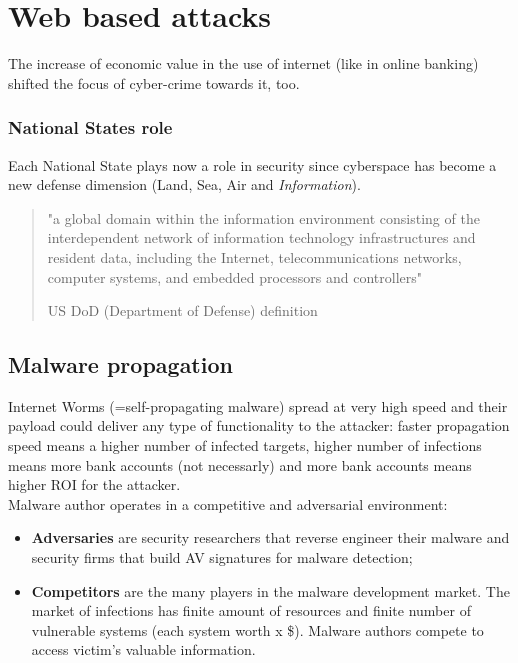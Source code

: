 \documentclass[a4paper, 10pt, titlepage]{article}
\begin{document}

\newpage
\section{Web based attacks}
The increase of economic value in the use of internet (like in online banking) shifted the focus of cyber-crime towards it, too.

\subsubsection*{National States role}
Each National State plays now a role in security since cyberspace has become a new defense dimension (Land, Sea, Air and \textit{Information}). 
\begin{quote}
	"a global domain within the information environment consisting of the interdependent network of information technology infrastructures and resident data, including the Internet, telecommunications networks, computer systems, and embedded processors and controllers"
	\begin{flushright}
		US DoD (Department of Defense) definition
	\end{flushright}
\end{quote}

\subsection{Malware propagation}
Internet Worms (=self-propagating malware) spread at very high speed and their payload could deliver any type of functionality to the attacker: faster propagation speed means a higher number of infected targets, higher number of infections means more bank accounts (not necessarly) and more bank accounts means higher ROI for the attacker. \\
Malware author operates in a competitive and adversarial environment:
\begin{itemize}
	\item \textbf{Adversaries} are security researchers that reverse engineer their malware and security firms that build AV signatures for malware detection;
	\item \textbf{Competitors} are the many players in the malware development market. The market of infections has finite amount of resources and finite number of vulnerable systems (each system worth x \$). Malware authors compete to access victim’s valuable information.
\end{itemize}
\end{document}
